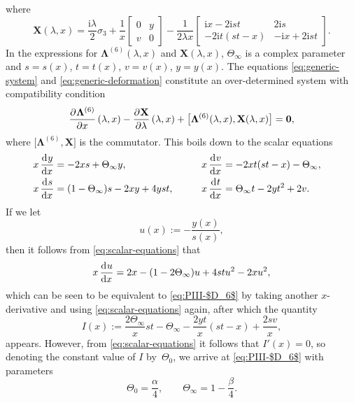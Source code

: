 \documentclass[11pt]{article}
\numberwithin{equation}{section}
\numberwithin{equation}{section}
\newcommand{\ii}{\mathrm{i}}
\begin{document}
where
\begin{equation*}
\mathbf{X}(\lambda, x) = \dfrac{\ii \lambda}{2} \sigma_3 + \dfrac{1}{x} \begin{bmatrix} 0 & y \\ v & 0 \end{bmatrix} - \dfrac{1}{2\lambda x} \begin{bmatrix} \ii x - 2\ii st & 2\ii s \\ -2\ii t(st - x) & -\ii x + 2\ii st\end{bmatrix}.
\end{equation*}
In the expressions for $\mathbf{\Lambda}^{(6)}(\lambda, x)$ and $\mathbf{X}(\lambda, x)$, $\Theta_\infty$ is a complex parameter and $s = s(x)$, $t = t(x)$, $ v = v(x)$, $y = y(x)$. The equations \eqref{eq:generic-system} and \eqref{eq:generic-deformation} constitute an over-determined system with compatibility condition
\[
\dpd{\mathbf{\Lambda}^{(6)}}{x}(\lambda, x) - \dpd{\mathbf X}{\lambda}(\lambda, x) + \big[\mathbf{\Lambda}^{(6)}(\lambda, x), \mathbf X(\lambda, x)\big] = \mathbf{0},
\]
where $\big[\mathbf{\Lambda}^{(6)}, \mathbf{X}\big]$ is the commutator. This boils down to the scalar equations
\begin{alignat}{3}
& x \dod{y}{x} = -2xs + \Theta_\infty y, \qquad&&
x \dod{v}{x} = -2xt(st - x) - \Theta_\infty,&\nonumber \\
&x \dod{s}{x} = (1 - \Theta_\infty)s - 2xy + 4yst, \qquad&&
x \dod{t}{x} = \Theta_\infty t - 2yt^2 + 2v.&
\label{eq:scalar-equations}
\end{alignat}
If we let
\begin{equation}
u(x) := - \dfrac{y(x)}{s(x)},
\label{eq:u-from-y-s}
\end{equation}
then it follows from \eqref{eq:scalar-equations} that
\[
x \dod{u}{x} = 2x - (1 - 2\Theta_\infty) u + 4stu^2 - 2xu^2,
\]
which can be seen to be equivalent to \eqref{eq:PIII-$D_6$} by taking another $x$-derivative and using \eqref{eq:scalar-equations} again, after which the quantity
\[
I(x) := \dfrac{2\Theta_\infty }{x} st - \Theta_\infty - \dfrac{2yt}{x}(st - x) + \dfrac{2sv}{x},
\]
appears. However, from \eqref{eq:scalar-equations} it follows that $I'(x) = 0$, so denoting the constant value of $I$ by~$\Theta_0$, we arrive at \eqref{eq:PIII-$D_6$} with parameters
\begin{equation}
 \Theta_0=\frac{\alpha}{4}, \qquad \Theta_\infty=1-\frac{\beta}{4}.
 \label{eq:thetas-alpha-beta}
\end{equation}
\end{document}
